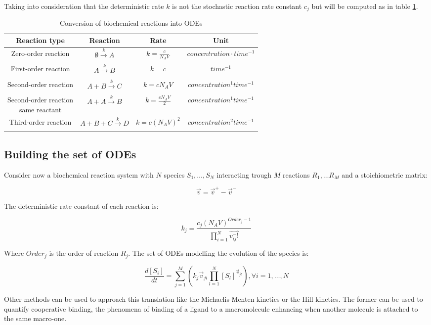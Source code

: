   Taking into consideration that the deterministic rate $k$ is not the stochastic reaction rate constant $c_j$ but will be computed as in table \ref{tab:chem-rates}.

  \begin{table}[H]
    \centering
    \begin{tabular}{c c c c}
      \hline
      Reaction type & Reaction & Rate & Unit\\
      \hline
      Zero-order reaction & $\emptyset\xrightarrow[]{k} A$ & $k = \frac{c}{N_AV}$ & $concentration\cdot time^{-1}$\\
      First-order reaction & $A\xrightarrow[]{k} B$ &  $k = c$ & $time^{-1}$\\
      Second-order reaction & $A+B\xrightarrow[]{k} C$ & $k = cN_AV$ & $concentration^1time^{-1}$\\
      \makecell{Second-order reaction\\ same reactant} & $A+A\xrightarrow[]{k} B$ & $k = \frac{cN_AV}{2}$ & $concentration^1time^{-1}$\\
      Third-order reaction & $A+B+C\xrightarrow[]{k} D$ & $k = c(N_AV)^2$ & $concentration^2time^{-1}$\\
      \hline
    \end{tabular}
    \caption{Conversion of biochemical reactions into ODEs}
    \label{tab:chem-rates}
  \end{table}

  \subsection{Building the set of ODEs}
  Consider now a biochemical reaction system with $N$ species $S_1, \dots, S_N$ interacting trough $M$ reactions $R_1, \dots R_M$ and a stoichiometric matrix:

  $$\vec{v} = \vec{v}^+-\vec{v}^-$$

  The deterministic rate constant of each reaction is:

  $$k_j = \frac{c_j(N_AV)^{Order_j-1}}{\prod\limits_{i=1}^N\vec{v_{ij}^-!}}$$

  Where $Order_j$ is the order of reaction $R_j$.
  The set of ODEs modelling the evolution of the species is:

  $$\frac{d[S_i]}{dt} = \sum\limits_{j=1}^M\left(k_j\vec{v}_{ji}\prod\limits_{l=1}^N[S_l]^{\vec{v}_{jl}}\right), \forall i = 1, \dots, N$$

  Other methods can be used to approach this translation like the Michaelis-Menten kinetics or the Hill kinetics.
  The former can be used to quantify cooperative binding, the phenomena of binding of a ligand to a macromolecule enhancing when another molecule is attached to the same macro-one.

